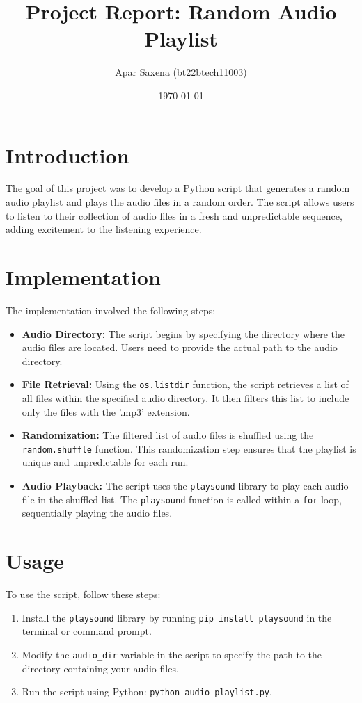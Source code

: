 \documentclass{article}
\title{Project Report: Random Audio Playlist}
\author{Apar Saxena (bt22btech11003)}
\date{\today}
\begin{document}
\maketitle

\section{Introduction}
The goal of this project was to develop a Python script that generates a random audio playlist and plays the audio files in a random order. The script allows users to listen to their collection of audio files in a fresh and unpredictable sequence, adding excitement to the listening experience.

\section{Implementation}
The implementation involved the following steps:

\begin{itemize}
    \item \textbf{Audio Directory:} The script begins by specifying the directory where the audio files are located. Users need to provide the actual path to the audio directory.
    \item \textbf{File Retrieval:} Using the \texttt{os.listdir} function, the script retrieves a list of all files within the specified audio directory. It then filters this list to include only the files with the '.mp3' extension.
    \item \textbf{Randomization:} The filtered list of audio files is shuffled using the \texttt{random.shuffle} function. This randomization step ensures that the playlist is unique and unpredictable for each run.
    \item \textbf{Audio Playback:} The script uses the \texttt{playsound} library to play each audio file in the shuffled list. The \texttt{playsound} function is called within a \texttt{for} loop, sequentially playing the audio files.
    
\end{itemize}

\section{Usage}
To use the script, follow these steps:

\begin{enumerate}
    \item Install the \texttt{playsound} library by running \texttt{pip install playsound} in the terminal or command prompt.
    \item Modify the \texttt{audio\_dir} variable in the script to specify the path to the directory containing your audio files.
    \item Run the script using Python: \texttt{python audio\_playlist.py}.
    
\end{enumerate}
\end{document}
